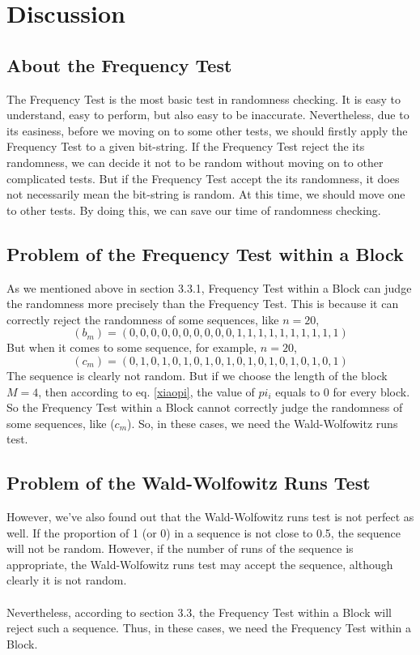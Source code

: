 \documentclass[a4paper,12pt]{article}
\begin{document}
\section{Discussion}
\subsection{About the Frequency Test}
\noindent The Frequency Test is the most basic test in randomness checking. It is easy to understand, easy to perform, but also easy to be inaccurate. Nevertheless, due to its easiness, before we moving on to some other tests, we should firstly apply the Frequency Test to a given bit-string. If the Frequency Test reject the its randomness, we can decide it not to be  random without moving on to other complicated tests. But if the Frequency Test accept the its randomness, it does not necessarily mean the bit-string is random. At this time, we should move one to other tests. By doing this, we can save our time of randomness checking.
\subsection{Problem of the Frequency Test within a Block}
\noindent As we mentioned above in section 3.3.1, Frequency Test within a Block can judge the randomness more precisely than the Frequency Test. This is because it can correctly reject the randomness of some sequences, like $n=20$,
$$
\left(b_{m}\right)=(0,0,0,0,0,0,0,0,0,0,
1,1,1,1,1,1,1,1,1,1)
$$
But when it comes to some sequence, for example, $n=20$,
$$
\left(c_{m}\right)=(0,1,0,1,0,1,0,1,0,1,0,1,0,1,0,1,0,1,0,1)
$$
The sequence is clearly not random. But if we  choose the length of the block $M=4$, then according to eq. \eqref{xiaopi}, the value of $pi_i$ equals to 0 for every block. So the Frequency Test within a Block cannot correctly judge the randomness of some sequences, like ($c_m$). So, in these cases, we need the Wald-Wolfowitz runs test.
\subsection{Problem of the Wald-Wolfowitz Runs Test}
\noindent However, we've also found out that the Wald-Wolfowitz runs test is not perfect as well. If the proportion of 1 (or 0) in a sequence is not close to 0.5, the sequence will not be random. However, if the number of runs of the sequence is appropriate, the Wald-Wolfowitz runs test may accept the sequence, although clearly it is not random.
\\\\Nevertheless, according to section 3.3, the Frequency Test within a Block will reject such a sequence. Thus, in these cases, we need the Frequency Test within a Block.
\end{document}
